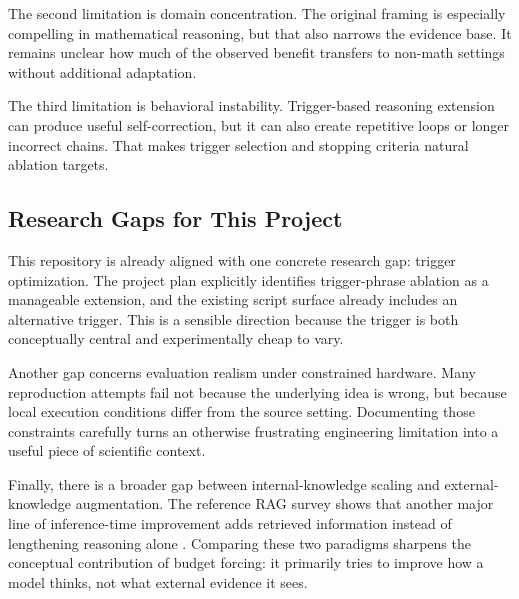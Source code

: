 The second limitation is domain concentration. The original framing is especially compelling in mathematical reasoning, but that also narrows the evidence base. It remains unclear how much of the observed benefit transfers to non-math settings without additional adaptation.

The third limitation is behavioral instability. Trigger-based reasoning extension can produce useful self-correction, but it can also create repetitive loops or longer incorrect chains. That makes trigger selection and stopping criteria natural ablation targets.

\subsection{Research Gaps for This Project}

This repository is already aligned with one concrete research gap: trigger optimization. The project plan explicitly identifies trigger-phrase ablation as a manageable extension, and the existing script surface already includes an alternative trigger. This is a sensible direction because the trigger is both conceptually central and experimentally cheap to vary.

Another gap concerns evaluation realism under constrained hardware. Many reproduction attempts fail not because the underlying idea is wrong, but because local execution conditions differ from the source setting. Documenting those constraints carefully turns an otherwise frustrating engineering limitation into a useful piece of scientific context.

Finally, there is a broader gap between internal-knowledge scaling and external-knowledge augmentation. The reference RAG survey shows that another major line of inference-time improvement adds retrieved information instead of lengthening reasoning alone \citep{li2025rag}. Comparing these two paradigms sharpens the conceptual contribution of budget forcing: it primarily tries to improve how a model thinks, not what external evidence it sees.